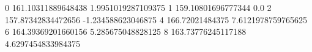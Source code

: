 0 161.10311889648438 1.9951019287109375
1 159.10801696777344 0.0
2 157.87342834472656 -1.234588623046875
4 166.72021484375 7.6121978759765625
6 164.39369201660156 5.285675048828125
8 163.73776245117188 4.6297454833984375
